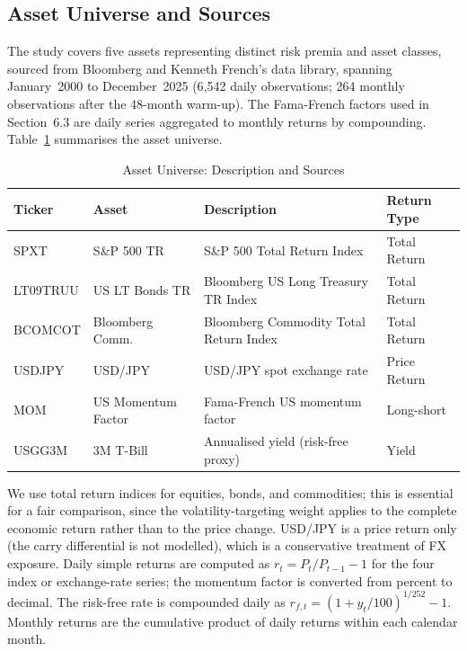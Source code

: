 \documentclass[12pt, a4paper]{article}
\begin{document}
\subsection{Asset Universe and Sources}

The study covers five assets representing distinct risk premia and asset classes, sourced
from Bloomberg and Kenneth French's data library, spanning January~2000 to December~2025
(6{,}542 daily observations; 264 monthly observations after the 48-month warm-up). The
Fama-French factors used in Section~6.3 are daily series aggregated to monthly returns by
compounding. Table~\ref{tab:assets} summarises the asset universe.

\begin{table}[H]
\centering
\small
\caption{Asset Universe: Description and Sources}
\label{tab:assets}
\begin{tabularx}{\textwidth}{llXl}
\toprule
\textbf{Ticker} & \textbf{Asset} & \textbf{Description} & \textbf{Return Type}\\
\midrule
SPXT      & S\&P 500 TR        & S\&P 500 Total Return Index             & Total Return\\
LT09TRUU  & US LT Bonds TR     & Bloomberg US Long Treasury TR Index     & Total Return\\
BCOMCOT   & Bloomberg Comm.    & Bloomberg Commodity Total Return Index  & Total Return\\
USDJPY    & USD/JPY            & USD/JPY spot exchange rate              & Price Return\\
MOM       & US Momentum Factor & Fama-French US momentum factor          & Long-short\\
\addlinespace
USGG3M    & 3M T-Bill          & Annualised yield (risk-free proxy)      & Yield\\
\bottomrule
\end{tabularx}
\end{table}

We use total return indices for equities, bonds, and commodities; this is essential for a
fair comparison, since the volatility-targeting weight applies to the complete economic
return rather than to the price change. USD/JPY is a price return only (the carry
differential is not modelled), which is a conservative treatment of FX exposure. Daily
simple returns are computed as $r_t=P_t/P_{t-1}-1$ for the four index or exchange-rate
series; the momentum factor is converted from percent to decimal. The risk-free rate is
compounded daily as $r_{f,t}=(1+y_t/100)^{1/252}-1$. Monthly returns are the cumulative
product of daily returns within each calendar month.
\end{document}
